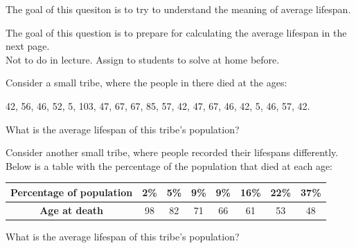 	

\bookonlynewpage


\question The goal of this quesiton is to try to understand the meaning of average lifespan.
\begin{annotation}
\begin{goals}
	The goal of this question is to prepare for calculating the average lifespan in the next page. \\

	Not to do in lecture. Assign to students to solve at home before.
\end{goals}
\end{annotation}
\begin{parts}
	\item Consider a small tribe, where the people in there died at the ages:		
		\begin{graybox}
		\begin{center}
			42, 56, 46, 52, 5, 103, 47, 67, 67, 85, 57, 42, 47, 67, 46, 42, 5, 46, 57, 42.
		\end{center}
		\end{graybox}
		What is the average lifespan of this tribe's population? %

	\item  Consider another small tribe, where people recorded their lifespans differently. Below is a table with the percentage of the population that died at each age:
		\begin{graybox}
		\begin{center}
		\begin{tabular}{c||c|c|c|c|c|c|c}
			\textbf{Percentage of population}
				& 2\% & 5\% & 9\% & 9\% & 16\% & 22\% & 37\% \\ \hline
			\textbf{Age at death}
				& 98 & 82 & 71 & 66 & 61 & 53 & 48\\
		\end{tabular}
		\end{center}
		\end{graybox}
		What is the average lifespan of this tribe's population? %
\end{parts}
 

\vfill



\bookonlynewpage



